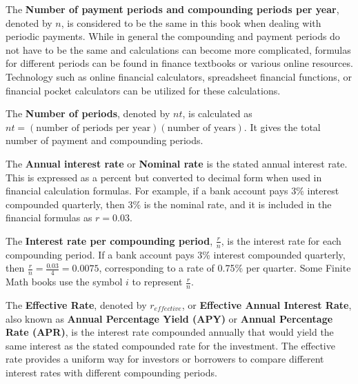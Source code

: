 \begin{definition}
    The \textbf{Number of payment periods and compounding periods per year}, denoted by \(n\), is considered to be the same in this book when dealing with periodic payments. While in general the compounding and payment periods do not have to be the same and calculations can become more complicated, formulas for different periods can be found in finance textbooks or various online resources. Technology such as online financial calculators, spreadsheet financial functions, or financial pocket calculators can be utilized for these calculations.
\end{definition}

\begin{definition}
    The \textbf{Number of periods}, denoted by \(nt\), is calculated as \(nt = (\text{number of periods per year})(\text{number of years})\). It gives the total number of payment and compounding periods.
\end{definition}

\begin{definition}
    The \textbf{Annual interest rate} or \textbf{Nominal rate} is the stated annual interest rate. This is expressed as a percent but converted to decimal form when used in financial calculation formulas. For example, if a bank account pays 3\% interest compounded quarterly, then 3\% is the nominal rate, and it is included in the financial formulas as \(r = 0.03\).
\end{definition}

\begin{definition}
    The \textbf{Interest rate per compounding period}, \( \frac{r}{n} \), is the interest rate for each compounding period. If a bank account pays 3\% interest compounded quarterly, then \( \frac{r}{n} = \frac{0.03}{4} = 0.0075 \), corresponding to a rate of 0.75\% per quarter. Some Finite Math books use the symbol \(i\) to represent \( \frac{r}{n} \).
\end{definition}

\begin{definition}
    The \textbf{Effective Rate}, denoted by \( r_{effective} \), or \textbf{Effective Annual Interest Rate}, also known as \textbf{Annual Percentage Yield (APY)} or \textbf{Annual Percentage Rate (APR)}, is the interest rate compounded annually that would yield the same interest as the stated compounded rate for the investment. The effective rate provides a uniform way for investors or borrowers to compare different interest rates with different compounding periods.
\end{definition}

